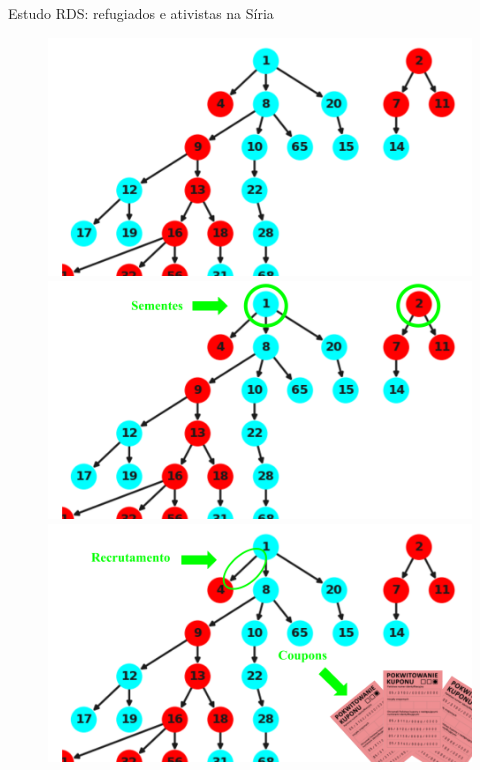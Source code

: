 \documentclass{beamer}
\begin{document}
\begin{frame}{Estudo RDS: refugiados e ativistas na Síria}
  \begin{figure}
    \begin{overprint}
    \includegraphics[width=\textwidth]{../../images/graph-rds-harvard-1.png}
    \includegraphics[width=\textwidth]{../../images/graph-rds-harvard-2.png}
    \includegraphics[width=\textwidth]{../../images/graph-rds-harvard-3.png}

\end{overprint}
\end{figure}
\end{frame}
\end{document}
